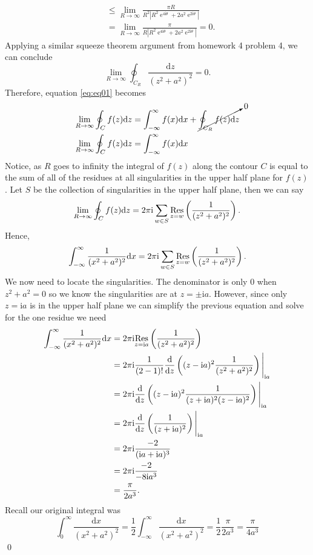 \documentclass[10pt]{amsart}
\newcommand{\D}{\mathrm{d}}
\newcommand{\I}{\mathrm{i}}
\DeclareMathOperator{\E}{e}
\theoremstyle{nonumberplain}
\begin{document}
\begin{enumerate}[label={\bf {\arabic*}:}]
\begin{align*}
	&\leq \lim_{R\rightarrow\infty} \frac {\pi R} {R^2\left|R^2\E^{4\I\theta} + 2a^2\E^{2\I\theta} \right|} \\
	&= \lim_{R\rightarrow\infty} \frac {\pi} {R\left|R^2\E^{4\I\theta} + 2a^2\E^{2\I\theta} \right|} = 0.
\end{align*}
Applying a similar squeeze theorem argument from homework 4 problem 4, we can conclude
$$
\lim_{R\rightarrow\infty} \oint_{C_R} \frac {\D z}{ (z^2 + a^2)^2 } = 0.
$$
Therefore, equation \eqref{eq:eq01} becomes
\begin{align*}
\lim_{R\rightarrow\infty} \oint_C f(z) \D z &= \int_{-\infty}^\infty f(x) \D x + \cancelto{0}{\oint_{C_R} f(z) \D z} \\
\lim_{R\rightarrow\infty} \oint_C f(z) \D z &= \int_{-\infty}^\infty f(x) \D x
\end{align*}
Notice, as $R$ goes to infinity the integral of $f(z)$ along the contour $C$ is equal to the sum of all of the residues at all singularities in the upper half plane for $f(z)$.
Let $S$ be the collection of singularities in the upper half plane, then we can say
$$
\lim_{R\rightarrow\infty} \oint_C f(z) \D z
	= 2\pi \I \sum_{w \in S} \underset{z=w}{\rm Res} \left( \frac 1 { (z^2 + a^2)^2 } \right). 
$$
Hence,
$$
\int_{-\infty}^\infty \frac 1 {(x^2 + a^2)^2} \D x
	= 2\pi \I \sum_{w \in S} \underset{z=w}{\rm Res} \left( \frac 1 { (z^2 + a^2)^2 } \right).
$$
We now need to locate the singularities.
The denominator is only 0 when $z^2 + a^2 = 0$ so we know the singularities are at $z = \pm \I a$.
However, since only $z = \I a$ is in the upper half plane we can simplify the previous equation and solve for the one residue we need
\begin{align*}
\int_{-\infty}^\infty \frac 1 {(x^2 + a^2)^2} \D x
	&= 2\pi \I \underset{z=\I a}{\rm Res} \left( \frac 1 { (z^2 + a^2)^2 } \right) \\
	&= 2\pi \I \frac 1 {(2 - 1)!}\frac {\D}{\D z} \left((z - \I a)^2\frac 1 {(z^2 + a^2)^2} \right)\Bigg|_{\I a} \\
	&= 2\pi \I \frac {\D}{\D z} \left((z - \I a)^2\frac 1 {(z + \I a)^2(z - \I a)^2} \right)\Bigg|_{\I a} \\
	&= 2\pi \I \frac {\D}{\D z} \left(\frac 1 {(z + \I a)^2} \right)\Bigg|_{\I a} \\
	&= 2\pi \I \frac {-2} {(\I a + \I a)^3} \\
	&= 2\pi \I \frac {-2} {- 8 \I a^3} \\
	&= \frac \pi {2 a^3}.
\end{align*}
Recall our original integral was
$$
\int_0^\infty \frac {\D x}{ (x^2 + a^2)^2 }
	= \frac 1 2 \int_{-\infty}^\infty \frac {\D x}{ (x^2 + a^2)^2 }
	= \frac 1 2 \frac \pi {2 a^3}
	= \frac \pi {4a^3}
$$
\qed \\


\end{enumerate}
\end{document}
